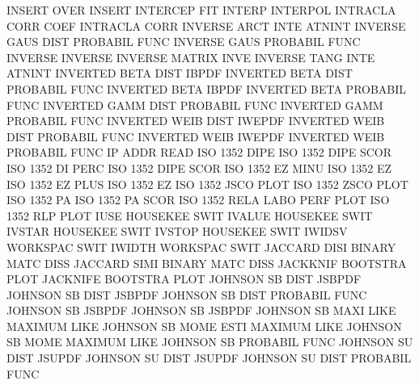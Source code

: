 INSERT   OVER                           INSERT
INTERCEP                                FIT
INTERP                                  INTERPOL
INTRACLA CORR COEF                      INTRACLA CORR
INVERSE  ARCT INTE                      ATNINT
INVERSE  GAUS DIST                      PROBABIL FUNC
INVERSE  GAUS                           PROBABIL FUNC
INVERSE                                 INVERSE
INVERSE                                 MATRIX   INVE
INVERSE  TANG INTE                      ATNINT
INVERTED BETA DIST                      IBPDF
INVERTED BETA DIST                      PROBABIL FUNC
INVERTED BETA                           IBPDF
INVERTED BETA                           PROBABIL FUNC
INVERTED GAMM DIST                      PROBABIL FUNC
INVERTED GAMM                           PROBABIL FUNC
INVERTED WEIB DIST                      IWEPDF
INVERTED WEIB DIST                      PROBABIL FUNC
INVERTED WEIB                           IWEPDF
INVERTED WEIB                           PROBABIL FUNC
IP       ADDR                           READ
ISO      1352 DIPE                      ISO      1352 DIPE SCOR
ISO      1352 DI   PERC                 ISO      1352 DIPE SCOR
ISO      1352 EZ   MINU                 ISO      1352 EZ
ISO      1352 EZ   PLUS                 ISO      1352 EZ
ISO      1352 JSCO PLOT                 ISO      1352 ZSCO PLOT
ISO      1352 PA                        ISO      1352 PA   SCOR
ISO      1352 RELA LABO PERF PLOT       ISO      1352 RLP  PLOT
IUSE                                    HOUSEKEE SWIT
IVALUE                                  HOUSEKEE SWIT
IVSTAR                                  HOUSEKEE SWIT
IVSTOP                                  HOUSEKEE SWIT
IWIDSV                                  WORKSPAC SWIT
IWIDTH                                  WORKSPAC SWIT
JACCARD  DISI                           BINARY   MATC DISS
JACCARD  SIMI                           BINARY   MATC DISS
JACKKNIF                                BOOTSTRA PLOT
JACKNIFE                                BOOTSTRA PLOT
JOHNSON  SB   DIST                      JSBPDF
JOHNSON  SB   DIST                      JSBPDF
JOHNSON  SB   DIST                      PROBABIL FUNC
JOHNSON  SB                             JSBPDF
JOHNSON  SB                             JSBPDF
JOHNSON  SB   MAXI LIKE                 MAXIMUM  LIKE
JOHNSON  SB   MOME ESTI                 MAXIMUM  LIKE
JOHNSON  SB   MOME                      MAXIMUM  LIKE
JOHNSON  SB                             PROBABIL FUNC
JOHNSON  SU   DIST                      JSUPDF
JOHNSON  SU   DIST                      JSUPDF
JOHNSON  SU   DIST                      PROBABIL FUNC
